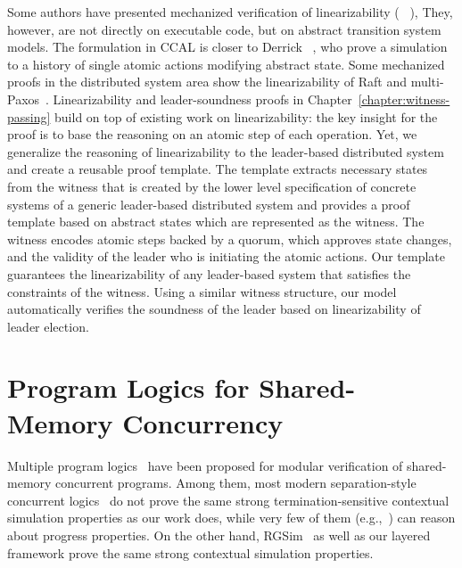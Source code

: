 Some
authors have presented mechanized verification of linearizability
(\eg~ \cite{DGLMQueue,DerrickSW11}),
They, however, are not directly on executable
code, but on abstract transition system models.
The formulation in CCAL is closer to Derrick \etal~\cite{DerrickSW11}, who prove a simulation
to a history of single atomic actions modifying abstract state.  
Some mechanized proofs in the distributed system area show 
the linearizability of Raft and
multi-Paxos~\cite{cppraft, ironfleet}.
%
Linearizability
and leader-soundness proofs in Chapter~\ref{chapter:witness-passing} build on top of existing work on
linearizability: the key insight for the proof is to base the reasoning on
an atomic step of each operation.  Yet, we generalize the reasoning of linearizability
to the leader-based distributed system and create a reusable proof template.
The template extracts
necessary states from the witness that is created by the lower level
specification of concrete systems
of a generic leader-based distributed system and provides a proof template based on
abstract states which are represented as the witness.
The witness encodes atomic steps backed by a quorum, which approves state
changes, and the validity of the leader who is initiating the atomic actions.
Our template guarantees the linearizability of any leader-based system that
satisfies the constraints of the witness. Using a similar witness structure, our
model automatically verifies the soundness of the leader based on
linearizability of leader election.




\section{Program Logics for Shared-Memory Concurrency}
\label{chatper:related:sec:program-logics-for-shared-memory-concurrency}

Multiple program  logics~
\cite{cap10, ohearn:concur04,brookes:concur04,feng07:sagl,vafeiadis:marriage,LRG,verifast,gotsman13,Turon13popl,Turon13icfp,nanevski13,nanevski14,
sergey15,sergey15pldi,pinto14,iris15,civl15,pinto16,xu16}
have been proposed for 
modular verification of shared-memory concurrent programs. 
Among them, most modern separation-style concurrent logics~
\cite{cap10,Turon13popl,sergey15pldi,pinto14,iris15,pinto16} do
not prove the same strong termination-sensitive contextual simulation
properties as our work does,
while very few of them (e.g.,~\cite{pinto16})
can reason about progress properties.
On the other hand,
RGSim~\cite{RGSim} as well as our layered framework prove the same strong contextual simulation properties.

